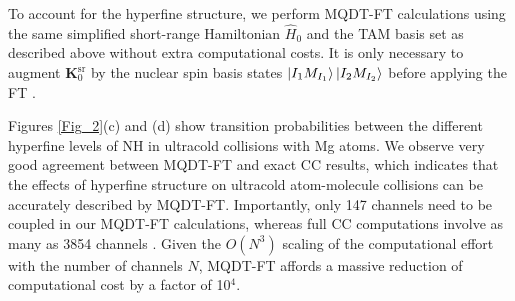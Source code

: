 \documentclass[reprint,amssymb,noeprint,twocolumn,longbibliography]{revtex4-2}
\begin{document}
To account for the hyperfine structure, we perform MQDT-FT calculations using the same simplified short-range Hamiltonian $\hat{H}_\mathrm{0}$ and the TAM basis set as described above without extra computational costs.
It is only necessary to augment $\bm{K}_\mathrm{0}^\text{sr}$ by the nuclear spin basis states $\ket{I_1M_{I_1}} \ket{I_2 M_{I_2}}$ before applying
the FT \cite{SM}.
 



Figures \ref{Fig_2}(c) and (d) show transition probabilities between the different hyperfine levels of NH in ultracold collisions with Mg atoms. 
We observe very good agreement between MQDT-FT and exact CC results, which indicates that the effects of hyperfine structure on ultracold atom-molecule collisions can be accurately described by MQDT-FT. 
Importantly, only 147 channels %
need to be coupled in our MQDT-FT calculations, whereas full CC computations involve as many as 3854 channels \cite{Maykel_11}. %
Given the $O(N^3)$ scaling of the computational effort with the number of channels $N$, MQDT-FT affords a massive reduction of computational cost by a factor of 10$^4$.
\end{document}
